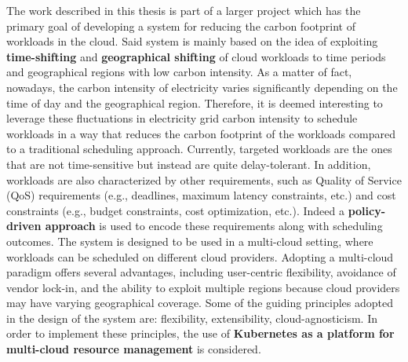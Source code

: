 The work described in this thesis is part of a larger project which has the primary goal of developing a system for reducing the carbon footprint of workloads in the cloud.
Said system is mainly based on the idea of exploiting \textbf{time-shifting} and \textbf{geographical shifting} of cloud workloads to time periods and geographical regions with low carbon intensity.
As a matter of fact, nowadays, the carbon intensity of electricity varies significantly depending on the time of day and the geographical region.
Therefore, it is deemed interesting to leverage these fluctuations in electricity grid carbon intensity to schedule workloads in a way that reduces the carbon footprint of the workloads compared to a traditional scheduling approach.
Currently, targeted workloads are the ones that are not time-sensitive but instead are quite delay-tolerant.
In addition, workloads are also characterized by other requirements, such as Quality of Service (QoS) requirements (e.g., deadlines, maximum latency constraints, etc.) and cost constraints (e.g., budget constraints, cost optimization, etc.).
Indeed a \textbf{policy-driven approach} is used to encode these requirements along with scheduling outcomes.
The system is designed to be used in a multi-cloud setting, where workloads can be scheduled on different cloud providers.
Adopting a multi-cloud paradigm offers several advantages, including user-centric flexibility, avoidance of vendor lock-in, and the ability to exploit multiple regions because cloud providers may have varying geographical coverage.
Some of the guiding principles adopted in the design of the system are: flexibility, extensibility, cloud-agnosticism.
In order to implement these principles, the use of \textbf{Kubernetes as a platform for multi-cloud resource management} is considered.



